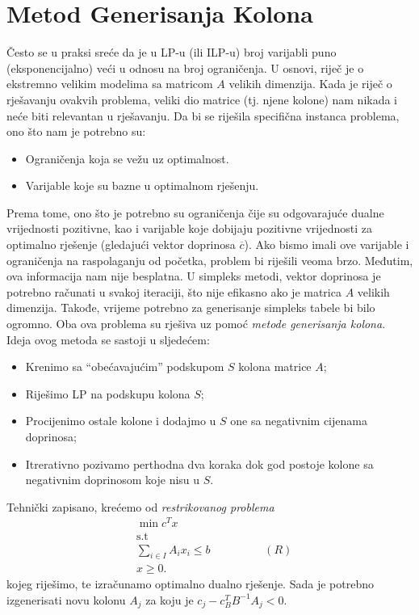 \documentclass[a4paper, utf8, 11pt, colorlinks]{book}
\begin{document}
\section{Metod Generisanja Kolona}%
Često se u praksi sreće da je u LP-u (ili ILP-u) broj varijabli puno (eksponencijalno) veći  u odnosu na broj ograničenja. U osnovi, riječ je o ekstremno velikim modelima sa matricom $A$ velikih dimenzija. Kada je riječ o rješavanju ovakvih problema, veliki dio matrice (tj. njene kolone) nam nikada i neće biti relevantan u rješavanju. Da bi se riješila specifična instanca problema, ono što nam je potrebno su:
\begin{itemize}
    \item Ograničenja koja se vežu uz optimalnost.
    \item Varijable koje su bazne u optimalnom rješenju.
\end{itemize}
Prema tome, ono što je potrebno su ograničenja čije su odgovarajuće   dualne vrijednosti pozitivne, kao i varijable koje dobijaju pozitivne vrijednosti za optimalno rješenje (gledajući vektor doprinosa $\overline{c}$). Ako bismo imali ove varijable i ograničenja na raspolaganju od početka, problem bi riješili veoma brzo. Međutim, ova informacija nam nije besplatna.  U simpleks metodi, vektor doprinosa je potrebno računati u svakoj iteraciji, što nije efikasno ako je matrica $A$ velikih dimenzija. Takođe, vrijeme potrebno za generisanje simpleks tabele bi bilo ogromno.  Oba ova problema su rješiva uz pomoć \emph{metode generisanja kolona}.  Ideja ovog metoda se sastoji u sljedećem:
\begin{itemize}
    \item Krenimo sa ``obećavajućim'' podskupom $S$ kolona matrice $A$; 
    \item Riješimo LP na podskupu kolona $S$; 
    \item Procijenimo ostale kolone i dodajmo u $S$ one sa negativnim 
          cijenama doprinosa;
    \item Itrerativno pozivamo perthodna dva koraka dok god postoje kolone   sa negativnim doprinosom koje nisu u $S$.
\end{itemize}
Tehnički zapisano, krećemo od \emph{restrikovanog problema}
\begin{align*}
    &\min c^T x \\
    &\mbox{s.t} \\
    & \sum_{i \in I} A_i x_i  \leq b \hspace{2cm} (R)\\
    & x \geq 0. 
\end{align*}
kojeg riješimo, te izračunamo optimalno dualno rješenje. Sada je potrebno izgenerisati novu kolonu $A_j$ za koju je $c_j - c_B^T B^{-1}A_j < 0$.
\end{document}
